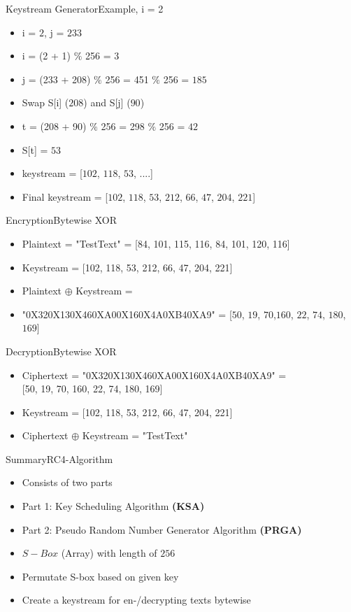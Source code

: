 \documentclass[
	aspectratio=169,	%
	onlytextwidth,		%
	t,					%
	]{beamer}
\begin{document}
\begin{frame}[fragile]{Keystream Generator}{Example, i = 2}
	\begin{itemize}
		\item i = $2$, j = $233$
		\item i = (2 + 1) $\%$ 256 = $3$
		\item j = (233 + 208) $\%$ 256 = 451 $\%$ 256 = $185$
		\item Swap S[i] ($208$) and S[j] ($90$)
		\item t = (208 + 90) $\%$ 256 = 298 $\%$ 256 = $42$
		\item S[t] = $53$
		\item keystream = [$102$, $118$, $53$, ....]
		\item Final keystream = [$102$, $118$, $53$, $212$, $66$, $47$, $204$, $221$]
	\end{itemize}
\end{frame}

\begin{frame}[fragile]{Encryption}{Bytewise XOR}
	\small
	\begin{itemize}
		\item Plaintext = "TestText" = {\color{purple}[84, 101, 115, 116, 84, 101, 120, 116]}
		\item Keystream = {\color{olive}[102, 118, 53, 212, 66, 47, 204, 221]}
		\item Plaintext $\oplus$ Keystream =
		\item "0X320X130X460XA00X160X4A0XB40XA9" = [$50$, $19$, $70$,$160$, $22$, $74$, $180$, $169$]
	\end{itemize}
	\normalsize
\end{frame}

\begin{frame}[fragile]{Decryption}{Bytewise XOR}
	\small
	\begin{itemize}
		\item Ciphertext = "0X320X130X460XA00X160X4A0XB40XA9" = \\{\color{purple}[50, 19, 70, 160, 22, 74, 180, 169]}
		\item Keystream = {\color{olive}[102, 118, 53, 212, 66, 47, 204, 221]} 
		\item Ciphertext $\oplus$ Keystream = "TestText"
	\end{itemize}
	\normalsize
\end{frame}

\begin{frame}[fragile]{Summary}{RC4-Algorithm}
	\begin{itemize}
		\item Consists of two parts
		\item Part 1: Key Scheduling Algorithm \textbf{(KSA)}
		\item Part 2: Pseudo Random Number Generator Algorithm \textbf{(PRGA)}
		\item $S-Box$ (Array) with length of $256$
		\item Permutate S-box based on given key
		\item Create a keystream for en-/decrypting texts bytewise
	\end{itemize}
\end{frame}
\end{document}
